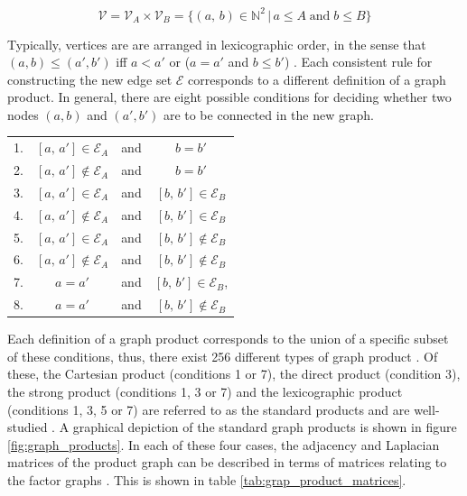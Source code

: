 \begin{equation}
    \mathcal{V} = \mathcal{V}_A \times \mathcal{V}_B = \{(a, \, b) \in \mathbb{N}^2 \, | \, a \leq A \; \text{and} \; b \leq B \}
\end{equation}


Typically, vertices are are arranged in lexicographic order, in the sense that $(a, b) \leq (a', b')$ iff $a < a'$ or ($a = a'$ and $b \leq b'$) \citep{Harzheim2005}. Each consistent rule for constructing the new edge set $\mathcal{E}$ corresponds to a different definition of a graph product. In general, there are eight possible conditions for deciding whether two nodes $(a, b)$ and $(a', b')$ are to be connected in the new graph.



\begin{table}[h]
\def\arraystretch{1.5}
\centering
\begin{tabular}{lclc}
1. & $[a, \, a'] \in \mathcal{E}_A$ & and &  $b = b'$  \\
2. & $[a, \, a'] \notin \mathcal{E}_A$  & and &  $b = b'$  \\
3. & $[a, \, a'] \in \mathcal{E}_A$ & and &  $[b, \, b'] \in \mathcal{E}_B$ \\
4. & $[a, \, a'] \notin \mathcal{E}_A$ & and &  $[b, \, b'] \in \mathcal{E}_B$  \\
5. & $[a, \, a'] \in \mathcal{E}_A$ & and & $[b, \, b'] \notin \mathcal{E}_B$  \\
6. & $[a, \, a'] \notin \mathcal{E}_A$ & and & $[b, \, b'] \notin \mathcal{E}_B$  \\
7. & $a = a'$ & and & $[b, \, b'] \in \mathcal{E}_B$,  \\
8. & $a = a'$ & and &  $[b, \, b'] \notin \mathcal{E}_B$ 
\end{tabular}
\end{table}



Each definition of a graph product corresponds to the union of a specific subset of these conditions, thus, there exist 256 different types of graph product \citep{Barik2015}. Of these, the Cartesian product (conditions 1 or 7), the direct product (condition 3), the strong product (conditions 1, 3 or 7) and the lexicographic product (conditions 1, 3, 5 or 7) are referred to as the standard products and are well-studied \citep{Imrich2000}. A graphical depiction of the standard graph products is shown in figure \ref{fig:graph_products}. In each of these four cases, the adjacency and Laplacian matrices of the product graph can be described in terms of matrices relating to the factor graphs \citep{Fiedler1973, Barik2018}. This is shown in table \ref{tab:grap_product_matrices}. 

